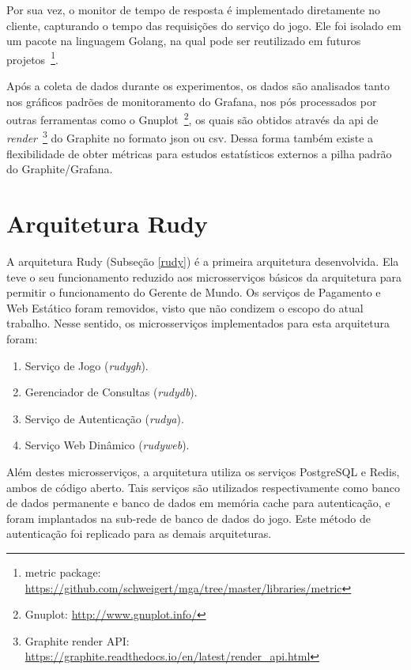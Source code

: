 Por sua vez, o monitor de tempo de resposta é implementado diretamente no cliente, capturando o tempo das requisições do serviço do jogo.
%
Ele foi isolado em um pacote na linguagem Golang, na qual pode ser reutilizado em futuros projetos~\footnote{metric package: \url{https://github.com/schweigert/mga/tree/master/libraries/metric}}.

Após a coleta de dados durante os experimentos, os dados são analisados tanto nos gráficos padrões de monitoramento do Grafana, nos pós processados por outras ferramentas como o Gnuplot~\footnote{Gnuplot: \url{http://www.gnuplot.info/}}, os quais são obtidos através da \ac{api} de \textit{render}~\footnote{Graphite render API: \url{https://graphite.readthedocs.io/en/latest/render_api.html}} do Graphite no formato \ac{json} ou \ac{csv}.
%
Dessa forma também existe a flexibilidade de obter métricas para estudos estatísticos externos a pilha padrão do Graphite/Grafana.



\section{Arquitetura Rudy}
\label{sec:arc_rudy}

A arquitetura Rudy (Subseção \ref{rudy}) é a primeira arquitetura desenvolvida.
%
Ela teve o seu funcionamento reduzido aos microsserviços básicos da arquitetura para permitir o funcionamento do Gerente de Mundo.
%
Os serviços de Pagamento e Web Estático foram removidos, visto que não condizem o escopo do atual trabalho.
%
Nesse sentido, os microsserviços implementados para esta arquitetura foram:

\begin{enumerate}
    \item Serviço de Jogo (\textit{rudygh}).
    \item Gerenciador de Consultas (\textit{rudydb}).
    \item Serviço de Autenticação (\textit{rudya}).
    \item Serviço Web Dinâmico (\textit{rudyweb}).
\end{enumerate}

Além destes microsserviços, a arquitetura utiliza os serviços PostgreSQL e Redis, ambos de código aberto.
%
Tais serviços são utilizados respectivamente como banco de dados permanente e banco de dados em memória cache para autenticação, e foram implantados na sub-rede de banco de dados do jogo.
%
Este método de autenticação foi replicado para as demais arquiteturas.

